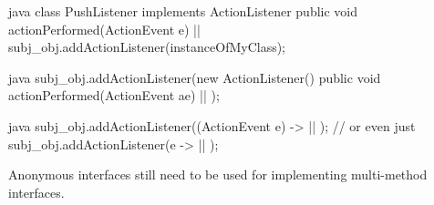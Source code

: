 \begin{codebox}{java}
class PushListener implements ActionListener {
  public void actionPerformed(ActionEvent e) { |\optldots| }
}
subj_obj.addActionListener(instanceOfMyClass);
\end{codebox}
\begin{codebox}{java}
subj_obj.addActionListener(new ActionListener() {
  public void actionPerformed(ActionEvent ae) {|\optldots|}
  });
\end{codebox}
\begin{codebox}{java}
subj_obj.addActionListener((ActionEvent e) -> {
  |\optldots|
  });
  // or even just
subj_obj.addActionListener(e -> {
  |\optldots|
  });
\end{codebox}
\begin{notebox}\nospacing
  Anonymous interfaces still need to be used for implementing multi-method interfaces.
\end{notebox}
